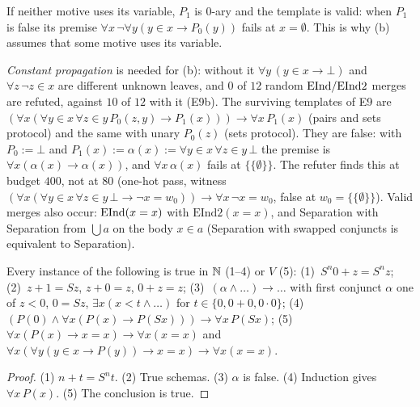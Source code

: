 If neither motive uses its variable, $P_1$ is $0$-ary and the template is valid: when $P_1$ is false its premise $\forall x\,\neg\forall y(y\in x\to P_0(y))$ fails at $x=\emptyset$. This is why (b) assumes that some motive uses its variable.

\emph{Constant propagation} is needed for (b): without it $\forall y\,(y\in x\to\bot)$ and $\forall z\,\neg z\in x$ are different unknown leaves, and $0$ of $12$ random $\mathrm{EInd}/\mathrm{EInd2}$ merges are refuted, against $10$ of $12$ with it (E9b). The surviving templates of E9 are $(\forall x(\forall y{\in}x\,\forall z{\in}y\,P_0(z,y)\to P_1(x)))\to\forall x\,P_1(x)$ (pairs and sets protocol) and the same with unary $P_0(z)$ (sets protocol). They are false: with $P_0:=\bot$ and $P_1(x):=\alpha(x):=\forall y{\in}x\,\forall z{\in}y\,\bot$ the premise is $\forall x(\alpha(x)\to\alpha(x))$, and $\forall x\,\alpha(x)$ fails at $\{\{\emptyset\}\}$. The refuter finds this at budget $400$, not at $80$ (one-hot pass, witness $(\forall x(\forall y{\in}x\,\forall z{\in}y\,\bot\to\neg x=w_0))\to\forall x\,\neg x=w_0$, false at $w_0=\{\{\emptyset\}\}$). Valid merges also occur: $\mathrm{EInd}(x=x)$ with $\mathrm{EInd2}(x=x)$, and Separation with Separation from $\bigcup a$ on the body $x\in a$ (Separation with swapped conjuncts is equivalent to Separation).

\begin{lemma}\label{lem:exp:valid}
Every instance of the following is true in $\mathbb{N}$ (1--4) or $V$ (5): (1)~$S^n0+z=S^nz$; (2)~$z+1=Sz$, $z+0=z$, $0+z=z$; (3)~$(\alpha\wedge\dots)\to\dots$ with first conjunct $\alpha$ one of $z<0$, $0=Sz$, $\exists x(x<t\wedge\dots)$ for $t\in\{0,0+0,0\cdot0\}$; (4)~$(P(0)\wedge\forall x(P(x)\to P(Sx)))\to\forall x\,P(Sx)$; (5)~$\forall x(P(x)\to x=x)\to\forall x(x=x)$ and $\forall x(\forall y(y\in x\to P(y))\to x=x)\to\forall x(x=x)$.
\end{lemma}

\begin{proof}
(1) $n+t=S^nt$. (2) True schemas. (3) $\alpha$ is false. (4) Induction gives $\forall x\,P(x)$. (5) The conclusion is true.
\end{proof}

